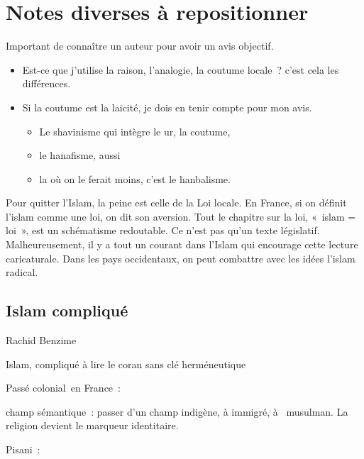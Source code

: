 \section{Notes diverses à repositionner}







Important de connaître un auteur pour avoir un avis objectif.





\begin{itemize}
\
  
\item
  Est-ce que j'utilise la raison, l'analogie, la coutume locale~? c'est
  cela les différences.
\item
  Si la coutume est la laicité, je dois en tenir compte pour mon avis.

  \begin{itemize}
  \item
    Le shavinisme qui intègre le ur, la coutume,
  \item
    le hanafisme, aussi~
  \item
    la où on le ferait moins, c'est le hanbalisme.
  \end{itemize}
\end{itemize}



  Pour quitter l'Islam, la peine est celle de la Loi locale. En France,
  si on définit l'islam comme une loi, on dit son aversion. Tout le
  chapitre sur la loi, «~islam = loi~», est un schématisme redoutable.
  Ce n'est pas qu'un texte législatif. Malheureusement, il y a tout un
  courant dans l'Islam qui encourage cette lecture caricaturale. Dans
  les pays occidentaux, on peut combattre avec les idées l'islam
  radical.
  
  
  \subsection{Islam compliqué}


Rachid Benzime

Islam, compliqué à lire le coran sans clé herméneutique

Passé colonial~en France~:

champ sémantique~: passer d'un champ indigène, à immigré, à ~musulman.
La religion devient le marqueur identitaire.

Pisani~:

